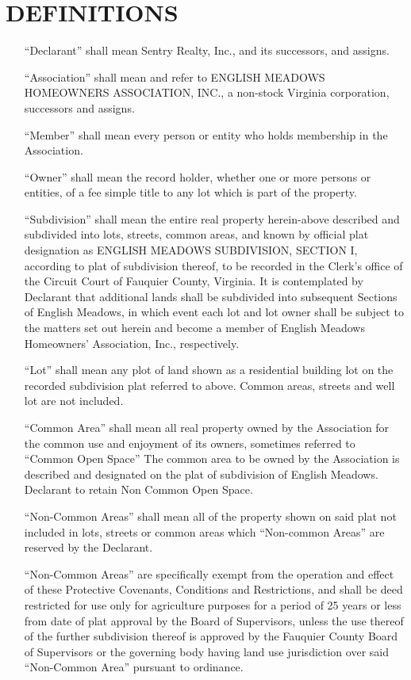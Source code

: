 \documentclass[10pt, letterpaper]{article}
\begin{document}
\section{DEFINITIONS}
\begin{itemize}
  \item[``Declarant''] shall mean Sentry Realty, Inc., and its successors, and assigns.
  \item[``Association''] shall mean and refer to ENGLISH MEADOWS HOMEOWNERS ASSOCIATION, INC., a non-stock Virginia corporation, successors and assigns.
  \item[``Member''] shall mean every person or entity who holds membership in the Association.
  \item[``Owner''] shall mean the record holder, whether one or more persons or entities, of a fee simple title to any lot which is part of the property.
  \item[``Subdivision''] shall mean the entire real property herein-above described and subdivided into lots, streets, common areas, and known by official plat designation as ENGLISH MEADOWS SUBDIVISION, SECTION I, according to plat of subdivision thereof, to be recorded in the Clerk's office of the Circuit Court of Fauquier County, Virginia.
    It is contemplated by Declarant that additional lands shall be subdivided into subsequent Sections of English Meadows, in which event each lot and lot owner shall be subject to the matters set out herein and become a member of English Meadows Homeowners' Association, Inc., respectively.
  \item[``Lot''] shall mean any plot of land shown as a residential building lot on the recorded subdivision plat referred to above.
    Common areas, streets and well lot are not included.
  \item[``Common Area''] shall mean all real property owned by the Association for the common use and enjoyment of its owners, sometimes referred to ``Common Open Space''
    The common area to be owned by the Association is described and designated on the plat of subdivision of English Meadows.
    Declarant to retain Non Common Open Space.

    ``Non-Common Areas'' shall mean all of the property shown on said plat not included in lots, streets or common areas which ``Non-common Areas'' are reserved by the Declarant.

    ``Non-Common Areas'' are specifically exempt from the operation and effect of these Protective Covenants, Conditions and Restrictions, and shall be deed restricted for use only for agriculture purposes for a period of 25 years or less from date of plat approval by the Board of Supervisors, unless the use thereof of the further subdivision thereof is approved by the Fauquier County Board of Supervisors or the governing body having land use jurisdiction over said ``Non-Common Area'' pursuant to ordinance.
\end{itemize}
\end{document}
